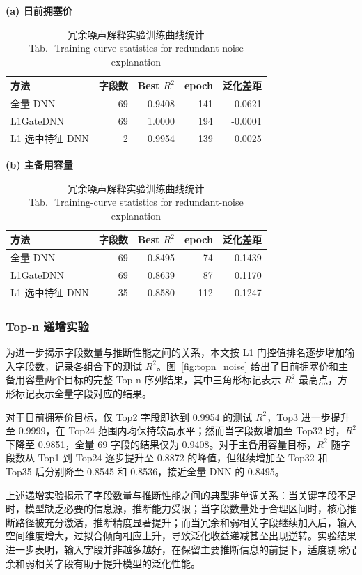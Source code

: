\documentclass[UTF8,zihao=5,twoside]{ctexart}
\numberwithin{equation}{section}
\newcommand{\tabbicaption}[2]{%
  \caption{#1\\[-0.2em]\small Tab.\,\thetable\ #2}
}
\begin{document}
\begin{table}[!tbp]
\centering
\scriptsize
\setlength{\tabcolsep}{3pt}
\tabbicaption{冗余噪声解释实验训练曲线统计}{Training-curve statistics for redundant-noise explanation}
\label{tab:noise_curve}
\textbf{(a) 日前拥塞价}\\[-0.2em]
\begin{tabularx}{\columnwidth}{Xrrrr}
\toprule
方法 & 字段数 & Best $R^2$ & epoch & 泛化差距 \\
\midrule
全量 DNN & 69 & 0.9408 & 141 & 0.0621 \\
L1GateDNN & 69 & 1.0000 & 194 & -0.0001 \\
L1 选中特征 DNN & 2 & 0.9954 & 139 & 0.0025 \\
\bottomrule
\end{tabularx}

\vspace{0.4em}
\textbf{(b) 主备用容量}\\[-0.2em]
\begin{tabularx}{\columnwidth}{Xrrrr}
\toprule
方法 & 字段数 & Best $R^2$ & epoch & 泛化差距 \\
\midrule
全量 DNN & 69 & 0.8495 & 74 & 0.1439 \\
L1GateDNN & 69 & 0.8639 & 87 & 0.1170 \\
L1 选中特征 DNN & 35 & 0.8580 & 112 & 0.1247 \\
\bottomrule
\end{tabularx}
\end{table}

\subsubsection{Top-n 递增实验}
为进一步揭示字段数量与推断性能之间的关系，本文按 L1 门控值排名逐步增加输入字段数，记录各组合下的测试 $R^2$。图~\ref{fig:topn_noise} 给出了日前拥塞价和主备用容量两个目标的完整 Top-n 序列结果，其中三角形标记表示 $R^2$ 最高点，方形标记表示全量字段对应的结果。

对于日前拥塞价目标，仅 Top2 字段即达到 0.9954 的测试 $R^2$，Top3 进一步提升至 0.9999，在 Top24 范围内均保持较高水平；然而当字段数增加至 Top32 时，$R^2$ 下降至 0.9851，全量 69 字段的结果仅为 0.9408。对于主备用容量目标，$R^2$ 随字段数从 Top1 到 Top24 逐步提升至 0.8872 的峰值，但继续增加至 Top32 和 Top35 后分别降至 0.8545 和 0.8536，接近全量 DNN 的 0.8495。

上述递增实验揭示了字段数量与推断性能之间的典型非单调关系：当关键字段不足时，模型缺乏必要的信息源，推断能力受限；当字段数量处于合理区间时，核心推断路径被充分激活，推断精度显著提升；而当冗余和弱相关字段继续加入后，输入空间维度增大，过拟合倾向相应上升，导致泛化收益递减甚至出现逆转。实验结果进一步表明，输入字段并非越多越好，在保留主要推断信息的前提下，适度剔除冗余和弱相关字段有助于提升模型的泛化性能。
\end{document}
